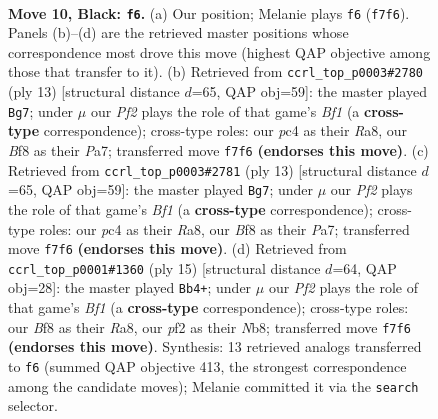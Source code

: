 \documentclass[11pt]{article}
\begin{document}
\clearpage

\begin{figure}[p]\centering
\begin{subfigure}{0.46\textwidth}\centering
\resizebox{\linewidth}{!}{%
\newchessgame
\chessboard[
  setfen={r1bqkb1r/pp3ppp/4p3/8/2PNn1PP/8/PP3P2/R1BQKB1R b KQkq - 0 10},
  showmover=false,
  pgfstyle=straightmove, color=movearrow, markmove={f7-f6}
]}
\caption{}
\end{subfigure}\hfill
\begin{subfigure}{0.46\textwidth}\centering
\resizebox{\linewidth}{!}{%
\newchessgame
\chessboard[
  setfen={rnbqkb1r/pp2pp1p/6p1/2p5/2BPP3/2P5/P4PPP/R1BQK1NR b KQkq - 1 7},
  showmover=false,
  pgfstyle=straightmove, color=movearrow, markmove={f8-g7}
]}
\caption{}
\end{subfigure}
\\[4pt]
\begin{subfigure}{0.46\textwidth}\centering
\resizebox{\linewidth}{!}{%
\newchessgame
\chessboard[
  setfen={rnbqkb1r/pp2pp1p/6p1/2p5/2BPP3/2P5/P4PPP/R1BQK1NR b KQkq - 1 7},
  showmover=false,
  pgfstyle=straightmove, color=movearrow, markmove={f8-g7}
]}
\caption{}
\end{subfigure}\hfill
\begin{subfigure}{0.46\textwidth}\centering
\resizebox{\linewidth}{!}{%
\newchessgame
\chessboard[
  setfen={rnbqkb1r/pp3ppp/4p3/8/3PP3/5N2/P4PPP/R1BQKB1R b KQkq - 0 8},
  showmover=false,
  pgfstyle=straightmove, color=movearrow, markmove={f8-b4}
]}
\caption{}
\end{subfigure}
\caption{\textbf{Move 10, Black: \texttt{f6}.} (a) Our position; Melanie plays \texttt{f6} (\texttt{f7f6}). Panels (b)--(d) are the retrieved master positions whose correspondence most drove this move (highest QAP objective among those that transfer to it). (b) Retrieved from \texttt{ccrl\_top\_p0003\#2780} (ply 13) [structural distance $d$=65, QAP obj=59]: the master played \texttt{Bg7}; under $\mu$ our \emph{Pf2} plays the role of that game's \emph{Bf1} (a \textbf{cross-type} correspondence); cross-type roles: our \emph{p}c4 as their \emph{R}a8, our \emph{B}f8 as their \emph{P}a7; transferred move \texttt{f7f6} \textbf{(endorses this move)}. (c) Retrieved from \texttt{ccrl\_top\_p0003\#2781} (ply 13) [structural distance $d$=65, QAP obj=59]: the master played \texttt{Bg7}; under $\mu$ our \emph{Pf2} plays the role of that game's \emph{Bf1} (a \textbf{cross-type} correspondence); cross-type roles: our \emph{p}c4 as their \emph{R}a8, our \emph{B}f8 as their \emph{P}a7; transferred move \texttt{f7f6} \textbf{(endorses this move)}. (d) Retrieved from \texttt{ccrl\_top\_p0001\#1360} (ply 15) [structural distance $d$=64, QAP obj=28]: the master played \texttt{Bb4+}; under $\mu$ our \emph{Pf2} plays the role of that game's \emph{Bf1} (a \textbf{cross-type} correspondence); cross-type roles: our \emph{B}f8 as their \emph{R}a8, our \emph{p}f2 as their \emph{N}b8; transferred move \texttt{f7f6} \textbf{(endorses this move)}. Synthesis: 13 retrieved analogs transferred to \texttt{f6} (summed QAP objective 413, the strongest correspondence among the candidate moves); Melanie committed it via the \texttt{search} selector.}
\label{fig:thought-m19}
\end{figure}
\end{document}
